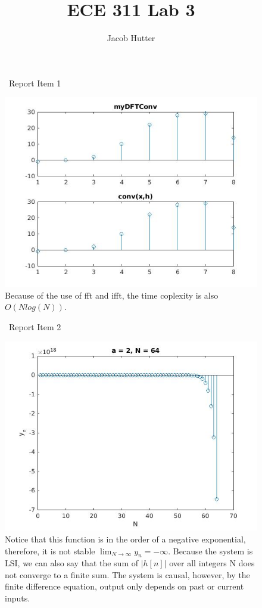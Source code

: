 \documentclass{article}
\author{Jacob Hutter}
\title{ECE 311 Lab 3}
\begin{document}
\maketitle

\begin{figure}[H]
\ Report Item 1

\includegraphics[scale = .5]{report1}
\\ Because of the use of fft and ifft, the time coplexity is also $O(Nlog(N))$.
\end{figure}



\begin{figure}[H]
\ Report Item 2

\includegraphics[scale = .5]{report2}
\\ Notice that this function is in the order of a negative exponential, 
therefore, it is not stable $\lim_{N\to\infty} y_n = -\infty$. Because the system is LSI, we can also say that the sum of $|h[n]|$ over all integers N does not converge to a finite sum.
The system is causal, however, by the finite difference equation, output only 
depends on past or current inputs.
\end{figure}
\end{document}
